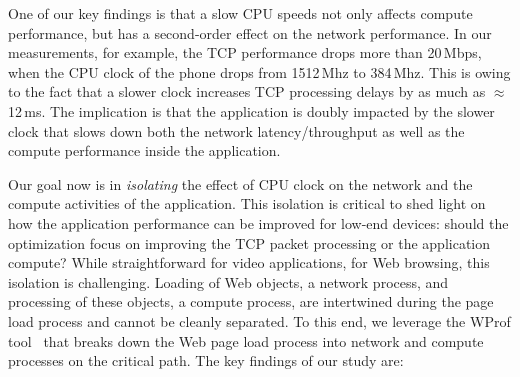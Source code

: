 One of our key findings is that a slow CPU speeds not only affects compute performance, but has a second-order effect on the network
performance. In our measurements, for example, the TCP performance drops more than 20\,Mbps, 
when the CPU clock of the phone drops from 1512\,Mhz to 384\,Mhz. This is owing to 
the fact that a slower clock
increases TCP processing delays by as much 
as $\approx$12\,ms.
The implication is that the application is doubly 
impacted by the slower clock that slows
down both the network latency/throughput as well as the compute 
performance inside the application. 

Our goal now is in {\em isolating} the effect of CPU clock on the network and the compute activities of the application. This isolation is critical to shed light on how the application 
performance can be improved for low-end devices: should the optimization focus on improving the TCP packet processing or the application compute? While straightforward for video applications, for Web browsing, this isolation is challenging.  
Loading of Web objects, a network process, and processing of these objects, a compute process, are intertwined during the page load process and cannot be cleanly separated. To this end, we leverage the WProf tool~\cite{wang2013demystifying,nejati2016depth} that breaks down the Web page load process into network and compute processes on the critical path. The key findings of our study are: %







